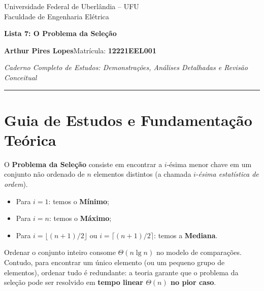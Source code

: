 \documentclass[11pt,a4paper]{article}
\begin{document}
\begin{center}
  {\small Universidade Federal de Uberlândia -- UFU\\Faculdade de Engenharia Elétrica}\par
  \vspace{4pt}
  {\LARGE\bfseries\color{azul} Lista 7: O Problema da Seleção}\par
  \vspace{4pt}
  \textbf{Arthur Pires Lopes}\quad Matrícula: \textbf{12221EEL001}\par
  \textit{Caderno Completo de Estudos: Demonstrações, Análises Detalhadas e Revisão Conceitual}
\end{center}
\hrule
\vspace{8pt}

\section*{Guia de Estudos e Fundamentação Teórica}

O \textbf{Problema da Seleção} consiste em encontrar a $i$-ésima menor chave em um conjunto não ordenado de $n$ elementos distintos (a chamada $i$-\textit{ésima estatística de ordem}).
\begin{itemize}
    \item Para $i = 1$: temos o \textbf{Mínimo};
    \item Para $i = n$: temos o \textbf{Máximo};
    \item Para $i = \lfloor (n+1)/2 \rfloor$ ou $i = \lceil (n+1)/2 \rceil$: temos a \textbf{Mediana}.
\end{itemize}

\begin{caixaEstudo}
Ordenar o conjunto inteiro consome $\Theta(n \lg n)$ no modelo de comparações. Contudo, para encontrar um único elemento (ou um pequeno grupo de elementos), ordenar tudo é redundante: a teoria garante que o problema da seleção pode ser resolvido em \textbf{tempo linear $\Theta(n)$ no pior caso}.
\end{caixaEstudo}
\end{document}
